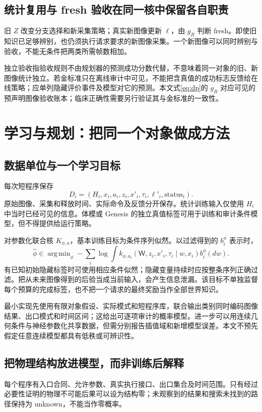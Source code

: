 \documentclass[11pt,a4paper,fontset=fandol]{ctexart}
\theoremstyle{definition}
\theoremstyle{remark}
\numberwithin{equation}{section}
\DeclareMathOperator*{\argmin}{arg\,min}
\begin{document}
\subsection{统计复用与 fresh 验收在同一核中保留各自职责}
旧 $Z$ 改变分支选择和新采集策略；真实新图像更新 $\ell$，由 $g_R$ 判断 fresh。即使旧知识已足够辨别，也仍须执行请求要求的新图像采集。一个新图像可以同时辨别与验收，不能无条件把两类所需帧数相加。

独立验收指验收规则不由规划器的预测成功分数代替，不意味着同一对象的旧、新图像统计独立。若金标准只在离线审计中可见，不能把含真值的成功标志反馈给在线策略；应单列隐藏评价事件及模型对它的预测。本文式\eqref{eq:dp}的 $g_R$ 对应可见的预声明图像验收账本；临床正确性需要另行验证其与金标准的一致性。

\section{学习与规划：把同一个对象做成方法}
\label{sec:learning}
\subsection{数据单位与一个学习目标}
每次短程序保存
\begin{equation}
 D_i=(H_i,x_i,a_i,z_i,x'_i,\tau_i,\ell'_i,\mathrm{status}_i).
 \label{eq:data}
\end{equation}
原始图像、采集和释放时间、实际命令及反馈分开保存。统计训练输入仅使用 $H_i$ 中当时已经可见的信息。体模或 Genesis 的独立真值标签可用于训练和审计条件模型，但不得提供给运行策略。

对参数化联合核 $K_{\phi,a}$，基本训练目标为条件序列似然。以过滤得到的 $b_i^\phi$ 表示时，
\begin{equation}
 \widehat\phi\in\argmin_\phi
 -\sum_i\log
 \int k_{\phi,a_i}(\mathsf W,z_i,x'_i,\tau_i\mid w,x_i)
 b_i^\phi(dw).
 \label{eq:likelihood}
\end{equation}
有已知初始隐藏标签时可使用相应条件似然；隐藏变量持续时应按整条序列正确过滤。把从未来图像得到的后验当成当前输入，会产生信息泄漏。该目标不单独监督每个预算的完成标签，也不把一个请求的最终奖励当作全部世界知识。

最小实现先使用有限对象假设、实际模式和短程序库，联合输出类别同时编码图像结果、出口模式和时间区间；这给出可逐项审计的概率模型。进一步可以用连续几何条件与神经参数化共享数据，但需分别报告插值域和新增模型误差。本文不预先假定任意连续模型都具有低秩或可辨识性。

\subsection{把物理结构放进模型，而非训练后解释}
每个程序有入口合同、允许参数、真实执行接口、出口集合及时间范围。只有经过必要性证明的物理不可能后果可以设为结构零；未观察到的结果和搜索未找到的路径保持为 unknown，不能当作零概率。
\end{document}
